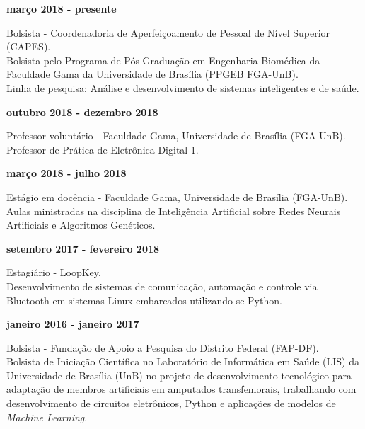 \documentclass[11pt]{article}
\begin{document}
\textbf{março 2018 - presente}
\begin{addmargin}{0.5cm}
Bolsista - Coordenadoria de Aperfeiçoamento de Pessoal de Nível Superior (CAPES). \\
Bolsista pelo Programa de Pós-Graduação em Engenharia Biomédica
da Faculdade Gama da Universidade de Brasília (PPGEB FGA-UnB).\\
Linha de pesquisa: Análise e desenvolvimento de sistemas inteligentes e de saúde.\\
\end{addmargin}

\textbf{outubro 2018 - dezembro 2018}
\begin{addmargin}{0.5cm}
Professor voluntário - Faculdade Gama, Universidade de Brasília (FGA-UnB).\\
Professor de Prática de Eletrônica Digital 1. \\
\end{addmargin}

\textbf{março 2018 - julho 2018}
\begin{addmargin}{0.5cm}
Estágio em docência - Faculdade Gama, Universidade de Brasília (FGA-UnB).\\
Aulas ministradas na disciplina de Inteligência Artificial sobre Redes 
Neurais Artificiais e Algoritmos Genéticos. \\
\end{addmargin}

\textbf{setembro 2017 - fevereiro 2018}
\begin{addmargin}{0.5cm}
Estagiário - LoopKey.\\
Desenvolvimento de sistemas de comunicação, automação e controle via Bluetooth
em sistemas Linux  embarcados utilizando-se Python. \\
\end{addmargin}

\newpage

\textbf{janeiro 2016 - janeiro 2017}
\begin{addmargin}{0.5cm}
Bolsista - Fundação de Apoio a Pesquisa do Distrito Federal (FAP-DF).\\
Bolsista de Iniciação Científica no Laboratório de Informática em Saúde (LIS)  da Universidade de
Brasília (UnB) no projeto
de desenvolvimento tecnológico para adaptação de membros artificiais em amputados transfemorais,
trabalhando com desenvolvimento de circuitos eletrônicos, Python e aplicações de modelos de 
\textit{Machine Learning}.\\

\end{addmargin}
\end{document}

